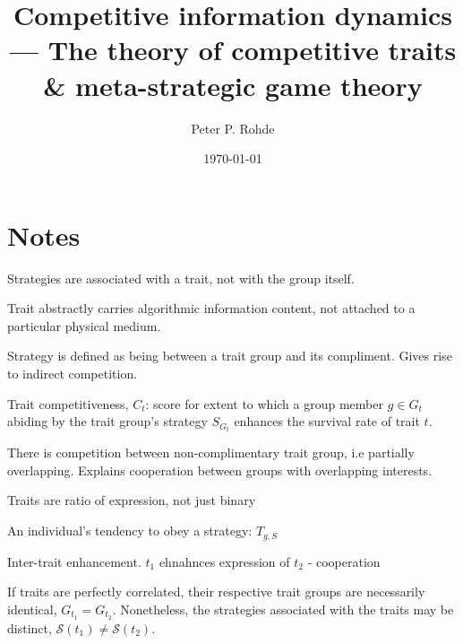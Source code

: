 \documentclass[twocolumn, aps, rmp, amsmath, amssymb, nofootinbib, superscriptaddress, longbibliography, floatfix, table-of-contents, eqsecnum]{revtex4-2}
\begin{document}
%
%

\title{Competitive information dynamics --- The theory of competitive traits \& meta-strategic game theory}

%
%

\author{Peter P. Rohde}

\date{\today}

\frenchspacing

%
%

\begin{abstract}
\end{abstract}

\maketitle

\tableofcontents

\section{Notes}

Strategies are associated with a trait, not with the group itself.

Trait abstractly carries algorithmic information content, not attached to a particular physical medium.

Strategy is defined as being between a trait group and its compliment. Gives rise to indirect competition.

Trait competitiveness, $C_t$: score for extent to which a group member $g\in G_t$ abiding by the trait group's strategy $S_{G_t}$ enhances the survival rate of trait $t$.

There is competition between non-complimentary trait group, i.e partially overlapping. Explains cooperation between groups with overlapping interests.

Traits are ratio of expression, not just binary

An individual's tendency to obey a strategy: $T_{g,S}$

Inter-trait enhancement. $t_1$ ehnahnces expression of $t_2$ - cooperation

If traits are perfectly correlated, their respective trait groups are necessarily identical, $G_{t_1}=G_{t_2}$. Nonetheless, the strategies associated with the traits may be distinct, $\mathcal{S}(t_1)\neq\mathcal{S}(t_2)$.
\end{document}
